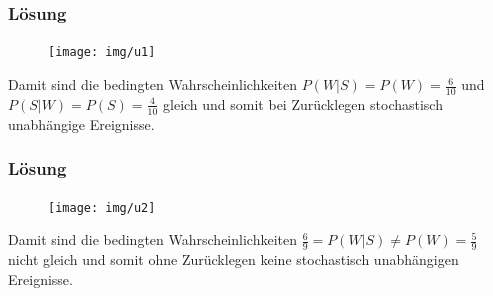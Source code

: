 \documentclass{beamer}
\begin{document}
\begin{frame}
    \frametitle{Lösung}
\framesubtitle{}

\begin{figure}[htp]
      \centering
    \texttt{[image: img/u1]}
\end{figure}
Damit sind die bedingten Wahrscheinlichkeiten $P(W|S) = P(W) = \frac{6}{10}$ und $P(S |W) = P(S  ) = \frac{4}{10}$ gleich und somit bei Zurücklegen stochastisch unabhängige Ereignisse.
 \end{frame}


\begin{frame}
    \frametitle{Lösung}
\framesubtitle{}

\begin{figure}[htp]
      \centering
    \texttt{[image: img/u2]}
\end{figure}
Damit sind die bedingten Wahrscheinlichkeiten $ \frac{6}{9} = P(W|S) \neq P(W) =  \frac{5}{9}$  nicht gleich und somit ohne Zurücklegen keine stochastisch unabhängigen Ereignisse.
 \end{frame}
\end{document}
